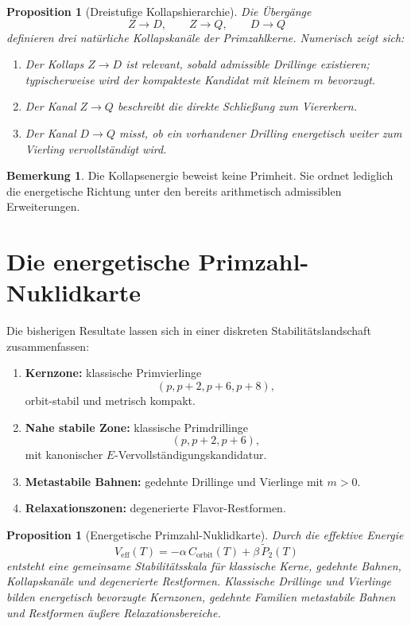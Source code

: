 \documentclass[11pt,a4paper]{article}
\theoremstyle{definition}
\newtheorem{remark}[definition]{Bemerkung}
\theoremstyle{plain}
\newtheorem{proposition}[definition]{Proposition}
\begin{document}
	\begin{proposition}[Dreistufige Kollapshierarchie]
		Die Übergänge
		\[
		Z\to D,\qquad Z\to Q,\qquad D\to Q
		\]
		definieren drei natürliche Kollapskanäle der Primzahlkerne. Numerisch zeigt sich:
		\begin{enumerate}[label=(\arabic*)]
			\item Der Kollaps $Z\to D$ ist relevant, sobald admissible Drillinge existieren; typischerweise wird der kompakteste Kandidat mit kleinem $m$ bevorzugt.
			\item Der Kanal $Z\to Q$ beschreibt die direkte Schließung zum Viererkern.
			\item Der Kanal $D\to Q$ misst, ob ein vorhandener Drilling energetisch weiter zum Vierling vervollständigt wird.
		\end{enumerate}
	\end{proposition}
	
	\begin{remark}
		Die Kollapsenergie beweist keine Primheit. Sie ordnet lediglich die energetische Richtung unter den bereits arithmetisch admissiblen Erweiterungen.
	\end{remark}
	
	\section{Die energetische Primzahl-Nuklidkarte}
	
	Die bisherigen Resultate lassen sich in einer diskreten Stabilitätslandschaft zusammenfassen:
	\begin{enumerate}[label=(\arabic*)]
		\item \textbf{Kernzone:} klassische Primvierlinge
		\[
		(p,p+2,p+6,p+8),
		\]
		orbit-stabil und metrisch kompakt.
		\item \textbf{Nahe stabile Zone:} klassische Primdrillinge
		\[
		(p,p+2,p+6),
		\]
		mit kanonischer $E$-Vervollständigungskandidatur.
		\item \textbf{Metastabile Bahnen:} gedehnte Drillinge und Vierlinge mit $m>0$.
		\item \textbf{Relaxationszonen:} degenerierte Flavor-Restformen.
	\end{enumerate}
	
	\begin{proposition}[Energetische Primzahl-Nuklidkarte]
		Durch die effektive Energie
		\[
		V_{\mathrm{eff}}(T)= -\alpha\,C_{\mathrm{orbit}}(T)+\beta\,\widetilde P_2(T)
		\]
		entsteht eine gemeinsame Stabilitätsskala für klassische Kerne, gedehnte Bahnen, Kollapskanäle und degenerierte Restformen. Klassische Drillinge und Vierlinge bilden energetisch bevorzugte Kernzonen, gedehnte Familien metastabile Bahnen und Restformen äußere Relaxationsbereiche.
	\end{proposition}
	
\end{document}
